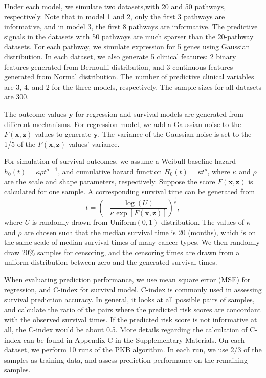 \documentclass[a4paper,12pt]{article}
\newcommand{\bd}[1]{\mathbf{#1}}
\begin{document}
Under each model, we simulate two datasets,with 20 and 50 pathways, respectively. Note that in model 1 and 2, only the first 3 pathways are informative, and in model 3, the first 8 pathways are informative. The predictive signals in the datasets with 50 pathways are much sparser than the 20-pathway datasets. For each pathway, we simulate expression for 5 genes using Gaussian distribution. In each dataset, we also generate 5 clinical features: 2 binary features generated from Bernoulli distribution, and 3 continuous features generated from Normal distribution. The number of predictive clinical variables are 3, 4, and 2 for the three models, respectively. The sample sizes for all datasets are 300.

The outcome values $\bd{y}$ for regression and survival models are generated from different mechanisms. For regression model, we add a Gaussian noise to the $F(\bd{x}, \bd{z})$ values to generate $\bd{y}$. The variance of the Gaussian noise is set to the 1/5 of the $F(\bd{x}, \bd{z})$ values' variance.

For simulation of survival outcomes, we assume a Weibull baseline hazard $h_0(t) = \kappa \rho t^{\rho-1}$, and cumulative hazard function $H_0(t) = \kappa t^{\rho}$, where $\kappa$ and $\rho$ are the scale and shape parameters, respectively. Suppose the score $F(\bd{x},\bd{z})$ is calculated for one sample. A corresponding survival time can be generated from
$$t = \left( - \frac{\log(U)}{\kappa \exp[F(\bd{x},\bd{z})]} \right)^{\frac{1}{\rho}},$$
where $U$ is randomly drawn from $\mbox{Uniform}(0,1)$ distribution. \citep{bender2005generating} The values of $\kappa$ and $\rho$ are chosen such that the median survival time is 20 (months), which is on the same scale of median survival times of many cancer types. We then randomly draw 20\% samples for censoring, and the censoring times are drawn from a uniform distribution between zero and the generated survival times.

When evaluating prediction performance, we use mean square error (MSE) for regression, and C-index for survival model.\citep{harrell1982evaluating} C-index is commonly used in assessing survival prediction accuracy. In general, it looks at all possible pairs of samples, and calculate the ratio of the pairs where the predicted risk scores are concordant with the observed survival times. If the predicted risk score is not informative at all, the C-index would be about 0.5. More details regarding the calculation of C-index can be found in Appendix C in the Supplementary Materials. On each dataset, we perform 10 runs of the PKB algorithm. In each run, we use 2/3 of the samples as training data, and assess prediction performance on the remaining samples. 
\end{document}

